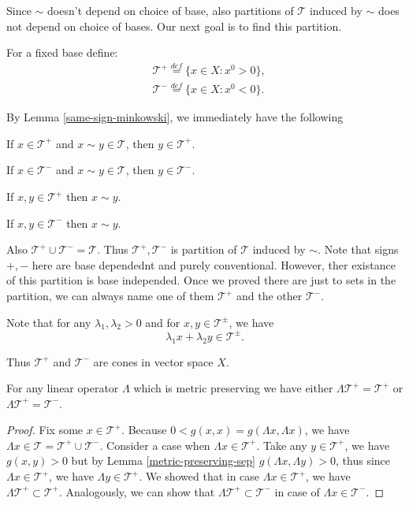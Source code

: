\documentclass[main.tex]{subfiles}
\begin{document}
Since $\sim$ doesn't depend on choice of base, also partitions of $\mathcal{T}$ induced by $\sim$ does not depend on choice of bases. Our next goal is to find this partition.

For a fixed base define:
\begin{align}
& \mathcal{T}^{+} \stackrel{def}{=} \{x\in X: x^0 > 0\},\\
& \mathcal{T}^{-} \stackrel{def}{=} \{x\in X: x^0 < 0\}.
\end{align}

By Lemma \ref{same-sign-minkowski}, we immediately have the following

If $x\in \mathcal{T}^{+}$ and $x\sim y\in \mathcal{T}$, then $y\in \mathcal{T}^{+}$.
 
If $x\in \mathcal{T}^{-}$ and $x\sim y\in \mathcal{T}$, then $y\in \mathcal{T}^{-}$.

If $x, y\in \mathcal{T}^{+}$ then $x\sim y$.

If $x, y\in \mathcal{T}^{-}$ then $x\sim y$.

Also   $\mathcal{T}^{+}\cup \mathcal{T}^{-} = \mathcal{T}$. Thus $\mathcal{T}^{+}, \mathcal{T}^{-}$ is partition of $\mathcal{T}$ induced by $\sim$. Note that signs $+, -$ here are base dependednt and purely conventional. However, ther existance of this partition is base independed. Once we proved there are just to sets in the partition, we can always name one of them $\mathcal{T}^{+}$ and the other $\mathcal{T}^{-}$.

Note that for any $\lambda_1, \lambda_2 > 0$ and for $x, y \in \mathcal{T}^{\pm}$, we have
\begin{equation}
\lambda_1x + \lambda_2y \in \mathcal{T}^{\pm}.
\end{equation}

Thus $\mathcal{T}^{+}$ and $\mathcal{T}^{-}$ are cones in vector space $X$.

\begin{proposition}
For any linear operator $\Lambda$ which is metric preserving we have either $\Lambda\mathcal{T}^{+} = \mathcal{T}^{+}$ or $\Lambda\mathcal{T}^{+} = \mathcal{T}^{-}$. 
\end{proposition}
\begin{proof}
Fix some $x \in \mathcal{T}^{+}$. Because $0 < g(x, x) = g(\Lambda x, \Lambda x)$, we have $\Lambda x\in \mathcal{T} = \mathcal{T}^{+}\cup \mathcal{T}^{-}$. Consider a case when $\Lambda x\in \mathcal{T}^{+}$. Take any $y\in  \mathcal{T}^{+}$, we have $g(x, y) > 0$ but by Lemma \ref{metric-preserving-sep} $g(\Lambda x, \Lambda y) > 0$, thus since $\Lambda x\in \mathcal{T}^{+}$, we have $\Lambda y\in  \mathcal{T}^{+}$. We showed that in case $\Lambda x\in \mathcal{T}^{+}$, we have $\Lambda\mathcal{T}^{+} \subset \mathcal{T}^{+}$. Analogously, we can show that $\Lambda\mathcal{T}^{+} \subset \mathcal{T}^{-}$ in case of $\Lambda x\in \mathcal{T}^{-}$.
\end{proof}
\end{document}
